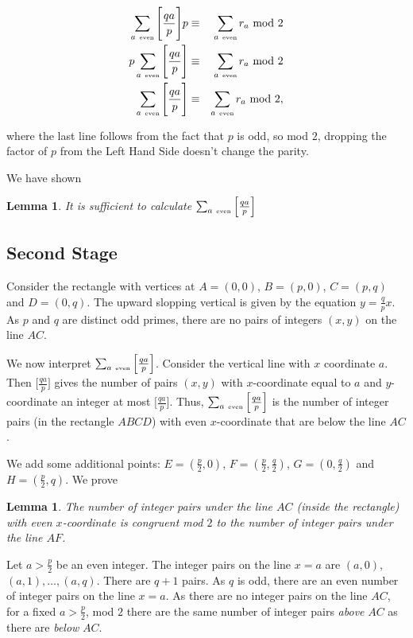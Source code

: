 \documentclass[12pt,letterpaper]{report}
\newcommand\bea{\begin{eqnarray}}
\newcommand\eea{\end{eqnarray}}
\newtheorem{lem}[thm]{Lemma}
\begin{document}
\bea \sum_{a \ \mbox{\tiny even}} \Bigg[ \frac{qa}{p} \Bigg] p &
\equiv & \sum_{a \ \mbox{\tiny even}} r_a \ \mbox{mod} \ 2
\nonumber\\ p \sum_{a \ \mbox{\tiny even}} \Bigg[ \frac{qa}{p}
\Bigg] & \equiv & \sum_{a \ \mbox{\tiny even}} r_a \ \mbox{mod} \
2 \nonumber\\ \sum_{a \ \mbox{\tiny even}} \Bigg[ \frac{qa}{p}
\Bigg] & \equiv & \sum_{a \ \mbox{\tiny even}} r_a \ \mbox{mod} \
2, \eea

where the last line follows from the fact that $p$ is odd, so mod
$2$, dropping the factor of $p$ from the Left Hand Side doesn't
change the parity.

We have shown

\begin{lem} It is sufficient to calculate $\sum_{a \ \mbox{\tiny even}} \Big[ \frac{qa}{p}
\Big]$ \end{lem}



\subsection{Second Stage}

Consider the rectangle with vertices at $A = (0,0)$, $B = (p,0)$,
$C = (p,q)$ and $D = (0,q)$. The upward slopping vertical is given
by the equation $y = \frac{q}{p}x$. As $p$ and $q$ are distinct
odd primes, there are no pairs of integers $(x,y)$ on the line
$AC$.

We now interpret $\sum_{a \ \mbox{\tiny even}} \Big[ \frac{qa}{p}
\Big]$. Consider the vertical line with $x$ coordinate $a$. Then
$\Big[ \frac{qa}{p} \Big]$ gives the number of pairs $(x,y)$ with
$x$-coordinate equal to $a$ and $y$-coordinate an integer at most
$\Big[ \frac{qa}{p} \Big]$. Thus, $\sum_{a \ \mbox{\tiny even}}
\Big[ \frac{qa}{p} \Big]$ is the number of integer pairs (in the
rectangle $ABCD$) with even $x$-coordinate that are below the line
$AC$.

We add some additional points: $E = (\frac{p}{2},0)$, $F =
(\frac{p}{2},\frac{q}{2})$, $G = (0,\frac{q}{2})$ and $H =
(\frac{p}{2},q)$. We prove

\begin{lem} The number of integer pairs under the line $AC$ (inside
the rectangle) with even $x$-coordinate is congruent mod $2$ to
the number of integer pairs under the line $AF$. \end{lem}

Let $a > \frac{p}{2}$ be an even integer. The integer pairs on the
line $x = a$ are $(a,0)$, $(a,1), \dots, (a,q)$. There are $q+1$
pairs. As $q$ is odd, there are an even number of integer pairs on
the line $x = a$. As there are no integer pairs on the line $AC$,
for a fixed $a
> \frac{p}{2}$, mod $2$ there are the same number of integer pairs
\emph{above} $AC$ as there are \emph{below} $AC$.
\end{document}
